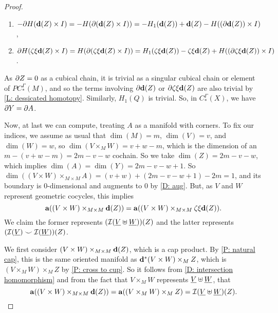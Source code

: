 \documentclass{amsart}
\begin{document}
\begin{proof}
\begin{enumerate}
\item $-\partial H(\mathbf{d}(Z)\times I)=-H(\partial (\mathbf{d}(Z)\times I))=-H_1(\mathbf{d}(Z))+\mathbf{d}(Z)-H((\partial\mathbf{d}(Z))\times I)$,

\item $\partial H(\zeta\xi\mathbf{d}(Z)\times I)=H(\partial (\zeta\xi\mathbf{d}(Z)\times I))=H_1(\zeta\xi\mathbf{d}(Z))-\zeta\xi\mathbf{d}(Z)+H((\partial\zeta\xi\mathbf{d}(Z))\times I)$.
\end{enumerate}
As $\partial Z=0$ as a cubical chain, it is trivial as a singular cubical chain or element of $PC_*^\Gamma(M)$, and so the terms involving $\partial\mathbf{d}(Z)$ or $\partial\zeta\xi\mathbf{d}(Z)$ are also trivial by \cref{L: dessicated homotopy}. Similarly, $H_1(Q)$ is trivial. So, in $C_*^\Gamma(X)$, we have $\partial Y=\partial A$.




Now, at last we can compute, treating $A$ as a manifold with corners. To fix our indices, we assume as usual that $\dim(M)=m$, $\dim(V)=v$, and $\dim(W)=w$, so $\dim(V\times_MW)= v+w-m$, which is the dimension of an $m-(v+w-m)=2m-v-w$ cochain. So we take $\dim(Z)=2m-v-w$, which implies $\dim(A)=\dim(Y)=2m-v-w+1$. So $\dim((V\times W)\times_{M\times M}A)=(v+w)+(2m-v-w+1)-2m=1$, and its boundary is $0$-dimensional and augments to $0$ by \cref{D: aug}. But, as $V$ and $W$ represent geometric cocycles,
this implies  $$\mathbf{a}((V\times W)\times_{M\times M}\mathbf{d}(Z))=\mathbf{a}((V\times W)\times_{M\times M}\zeta\xi\mathbf{d}(Z)).$$
We claim the former represents $(\mathcal{I}(\underline{V}\uplus\underline{W}))(Z)$ and the latter represents $(\mathcal{I}(\underline{V}) \smile \mathcal{I}(\underline{W}))(Z)$.

We first consider  $(V\times W)\times_{M\times M}\mathbf{d}(Z)$, which is a cap product. By \cref{P: natural cap}, this is the same oriented manifold as $\mathbf{d}^*(V\times W)\times_M Z$, which is $(V\times_MW)\times_M Z$ by \cref{P: cross to cup}.
So it follows from \cref{D: intersection homomorphism} and from the fact that $V\times_MW$ represents $\underline{V}\uplus \underline{W}$, that $$\mathbf{a}((V\times W)\times_{M\times M}\mathbf{d}(Z))=\mathbf{a}((V\times_MW)\times_M Z)=\mathcal{I}(\underline{V}\uplus \underline{W})(Z).$$


\end{proof}
\end{document}
